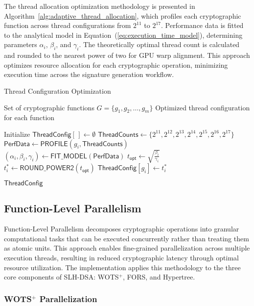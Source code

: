 \documentclass[journal]{IEEEtran}
\begin{document}
The thread allocation optimization methodology is presented in Algorithm~\ref{alg:adaptive_thread_allocation}, which profiles each cryptographic function across thread configurations from $2^{11}$ to $2^{17}$. Performance data is fitted to the analytical model in Equation~(\ref{eq:execution_time_model}), determining parameters $\alpha_i$, $\beta_i$, and $\gamma_i$. The theoretically optimal thread count is calculated and rounded to the nearest power of two for GPU warp alignment. This approach optimizes resource allocation for each cryptographic operation, minimizing execution time across the signature generation workflow.

\begin{algorithm}
  \caption{Thread Configuration Optimization}
  \label{alg:adaptive_thread_allocation}
  \begin{algorithmic}[1]
    \REQUIRE Set of cryptographic functions $G = \{g_1, g_2, \ldots, g_m\}$
    \ENSURE Optimized thread configuration for each function

    \STATE Initialize $\textsf{ThreadConfig}[\,] \gets \emptyset$
    \STATE $\textsf{ThreadCounts} \gets \{2^{11}, 2^{12}, 2^{13}, 2^{14}, 2^{15}, 2^{16}, 2^{17}\}$
    \STATE $\textsf{PerfData} \gets \textsf{PROFILE}(g_i, \textsf{ThreadCounts})$
    \STATE $(\alpha_i, \beta_i, \gamma_i) \gets \textsf{FIT\_MODEL}(\textsf{PerfData})$
    \STATE $t_{\textsf{opt}} \gets \sqrt{\frac{\beta_i}{\gamma_i}}$
    \STATE $t_i^* \gets \textsf{ROUND\_POWER2}(t_{\textsf{opt}})$
    \STATE $\textsf{ThreadConfig}[g_i] \gets t_i^*$
    \ENDFOR

    \RETURN $\textsf{ThreadConfig}$
  \end{algorithmic}
\end{algorithm}

\subsection{Function-Level Parallelism}


Function-Level Parallelism  decomposes cryptographic operations into granular computational tasks that can be executed concurrently rather than treating them as atomic units. This approach enables fine-grained parallelization across multiple execution threads, resulting in reduced cryptographic latency through optimal resource utilization. The implementation applies this methodology to the three core components of SLH-DSA: WOTS$^+$, FORS, and Hypertree.

\subsubsection{WOTS\texorpdfstring{$^+$}{+} Parallelization}
\end{document}
